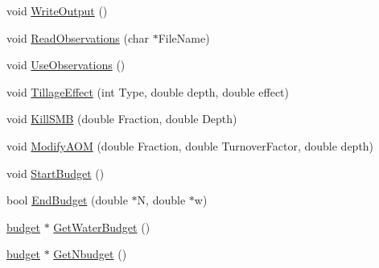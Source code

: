 \begin{DoxyCompactItemize}
void \hyperlink{classsoil_a2dfefa36aa46caa719e36780e87bee59}{WriteOutput} ()
\item 
void \hyperlink{classsoil_ae91c861ab961ed66f0beb9cd4fd5afcc}{ReadObservations} (char $\ast$FileName)
\item 
void \hyperlink{classsoil_a817adae4b17bca5a4f4d075295b5d09f}{UseObservations} ()
\item 
void \hyperlink{classsoil_a8c61b5403df7abbb44b6a369a509a69a}{TillageEffect} (int Type, double depth, double effect)
\item 
void \hyperlink{classsoil_a35efd012c78310446c1691c74d1a11d9}{KillSMB} (double Fraction, double Depth)
\item 
void \hyperlink{classsoil_a5c180783f496514ec193625e0cd6d501}{ModifyAOM} (double Fraction, double TurnoverFactor, double depth)
\item 
void \hyperlink{classsoil_a12a12882c22a4462895f9df500a9e77d}{StartBudget} ()
\item 
bool \hyperlink{classsoil_a8689520502e8522ac581ed1f4ed2a8a5}{EndBudget} (double $\ast$N, double $\ast$w)
\item 
\hyperlink{classbudget}{budget} $\ast$ \hyperlink{classsoil_abe759e9b029e5e09683bd2abb8678f36}{GetWaterBudget} ()
\item 
\hyperlink{classbudget}{budget} $\ast$ \hyperlink{classsoil_ac8c18b42bdf8d088ce09704f4d6d982f}{GetNbudget} ()
\end{DoxyCompactItemize}
